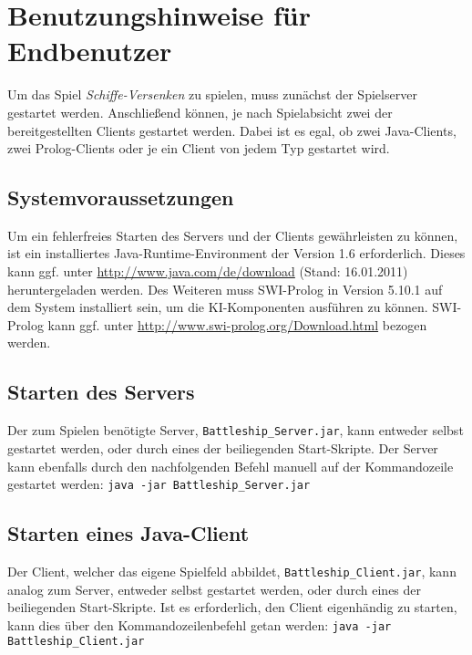 \section{Benutzungshinweise für Endbenutzer} \label{sec:Endbenutzer}
	Um das Spiel \textit{Schiffe-Versenken} zu spielen, muss zunächst der Spielserver gestartet werden. Anschließend können, je nach
	Spielabsicht zwei der bereitgestellten Clients gestartet werden. Dabei ist es egal, ob zwei Java-Clients, zwei Prolog-Clients oder
	je ein Client von jedem Typ gestartet wird. 
	
	\subsection{Systemvoraussetzungen} %
	\label{sub:systemvoraussetzungen}
		Um ein fehlerfreies Starten des Servers und der Clients gewährleisten zu können, ist ein installiertes Java-Runtime-Environment 
		der Version 1.6 erforderlich. Dieses kann ggf. unter \url{http://www.java.com/de/download} (Stand: 16.01.2011) heruntergeladen werden.
		\newline
		Des Weiteren muss SWI-Prolog in Version 5.10.1 auf dem System installiert sein, um die KI-Komponenten ausführen zu können. SWI-Prolog 
		kann ggf. unter \url{http://www.swi-prolog.org/Download.html} bezogen werden.
	
\subsection{Starten des Servers}
	Der zum Spielen benötigte Server, \texttt{Battleship\_Server.jar}, kann entweder selbst gestartet werden, oder 
	durch eines der beiliegenden Start-Skripte.
	Der Server kann ebenfalls durch den nachfolgenden Befehl manuell auf der Kommandozeile gestartet werden: \newline
	\texttt{java -jar Battleship\_Server.jar}\newline

\subsection{Starten eines Java-Client}
	Der Client, welcher das eigene Spielfeld abbildet, \texttt{Battleship\_Client.jar}, kann analog zum Server, entweder selbst gestartet werden, oder 
	durch eines der beiliegenden Start-Skripte.
	Ist es erforderlich, den Client eigenhändig zu starten, kann dies über den Kommandozeilenbefehl getan werden:\newline
	\texttt{java -jar Battleship\_Client.jar}\newline

